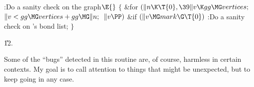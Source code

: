 \B{}:Do a sanity check on the graph\X${}\E{}$\6
${}\{{}$\1\6
\&{for} ${}(\|n\K\T{0},\39\|v\K\\{gg}\MG\\{vertices};{}$ ${}\|v<\\{gg}\MG%
\\{vertices}+\\{gg}\MG\|n;{}$ ${}\|v\PP){}$\1\6
\&{if} ${}(\|v\MG\\{mark}\G\T{0}){}$\1\5
:Do a sanity check on 's bond list\X;\2\2\6
\4${}\}{}$\2\par
\U12.\fi

Some of the ``bugs'' detected in this routine are, of
course,
harmless in certain contexts. My goal is to call attention to
things that might be unexpected, but to keep going in any case.

